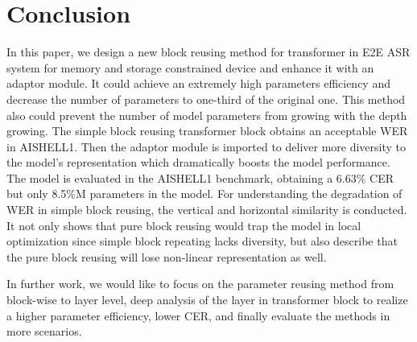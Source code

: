 \documentclass{INTERSPEECH2023}
\begin{document}
 \section{Conclusion} \label{sec:Conclusion}
In this paper, we design a new block reusing method for transformer in E2E ASR system for memory and storage constrained device and enhance it with an adaptor module. It could achieve an extremely high parameters efficiency and decrease the number of parameters to one-third of the original one. This method also could prevent the number of model parameters from growing with the depth growing. The simple block reusing transformer block obtains an acceptable WER in AISHELL1. Then the adaptor module is imported to deliver more diversity to the model's representation which dramatically boosts the model performance. The model is evaluated in the AISHELL1 benchmark, obtaining a 6.63\% CER but only 8.5\%M parameters in the model. For understanding the degradation of WER in simple block reusing, the vertical and horizontal similarity is conducted. It not only shows that pure block reusing would trap the model in local optimization since simple block repeating lacks diversity, but also describe that the pure block reusing will lose non-linear representation as well.

In further work, we would like to focus on the parameter reusing method from block-wise to layer level, deep analysis of the layer in transformer block to realize a higher parameter efficiency, lower CER, and finally evaluate the methods in more scenarios. 


\end{document}

